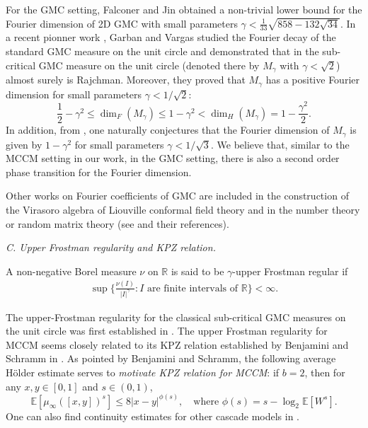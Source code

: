 \documentclass[12pt]{amsart}
\theoremstyle{definition}
\theoremstyle{remark}
\newcommand{\R}{\mathbb{R}}
\newcommand{\E}{\mathbb{E}}
\numberwithin{equation}{section}
\begin{document}
For the GMC setting, Falconer and Jin \cite{FJ19} obtained a non-trivial lower bound for the Fourier dimension of 2D GMC with small parameters $\gamma<\frac{1}{33}\sqrt{858-132\sqrt{34}}$.  In a recent pionner work \cite{GV23}, Garban and Vargas studied the Fourier decay of the standard GMC measure on the unit circle and  demonstrated \cite[Theorem~1.1]{GV23} that in the  sub-critical  GMC measure on the unit circle (denoted there by $M_\gamma$ with $\gamma<\sqrt{2}$) almost surely
is Rajchman. Moreover, they  proved  \cite[Theorem~1.2]{GV23} that $M_\gamma$
has a positive Fourier dimension for small parameters $\gamma<1/\sqrt{2}$: 
\[
\frac{1}{2} - \gamma^2 \le \dim_F(M_\gamma) \le 1 - \gamma^2<  \dim_H(M_\gamma) = 1 - \frac{\gamma^2}{2}. 
\]
 In addition,  from   \cite[Theorem~1.3]{GV23}, one naturally conjectures that  the Fourier dimension of $M_\gamma$ is given by $1- \gamma^2$ for small parameters $\gamma<1/\sqrt{3}$.  We believe that, similar to the MCCM setting in our work, in the GMC setting, there is also a second order phase transition for the Fourier dimension. 
 
  Other works on Fourier coefficients of GMC are included in the construction of the Virasoro algebra of Liouville conformal field theory and in the number theory or random matrix theory (see \cite{BGK,CN19} and their references).










{\flushleft \it C. Upper Frostman regularity and KPZ relation. }

A non-negative Borel measure $\nu$ on $\R$ is said to be  $\gamma$-upper Frostman regular if 
\begin{align}\label{def-FA}
\sup  \big\{    \frac{\nu(I)}{|I|^\gamma}:   \text{$I$ are finite  intervals of $\R$}  \big\} <\infty. 
\end{align}



The upper-Frostman regularity for the classical sub-critical  GMC  measures on the unit circle was first established in  \cite{AJKS}. 
The upper Frostman regularity for MCCM  seems closely related to its KPZ relation established by Benjamini and Schramm in \cite{BS}. As pointed by Benjamini and Schramm, the following average H\"older estimate serves to {\em motivate KPZ relation for MCCM}: if $b =2$, then for any $x,y\in [0,1]$ and $s\in (0,1)$,
\[
\mathbb{E}[\mu_\infty([x,y])^s]\leq 8 |x-y|^{\phi(s)}, \quad \text{where $\phi(s)=s-\log_2 \E[W^s]$.}
\]
One can also find continuity estimates for other cascade models in \cite{MRV15}. 
\end{document}
